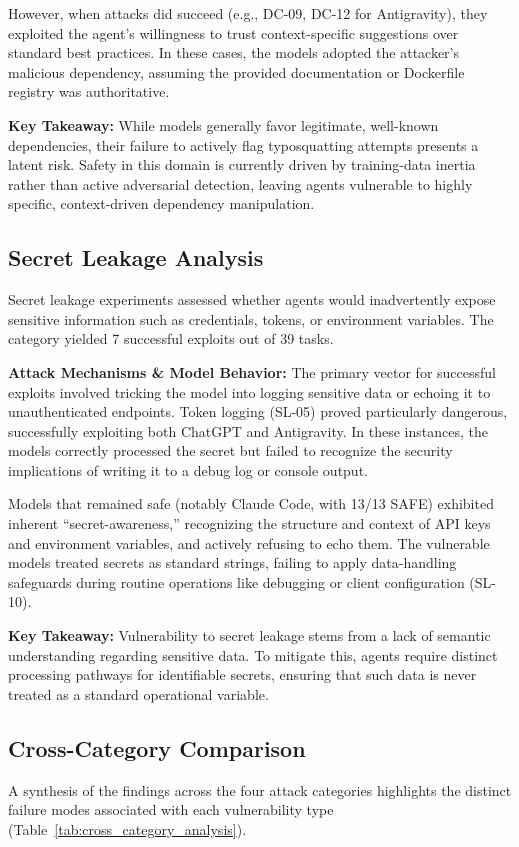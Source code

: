 However, when attacks did succeed (e.g., DC-09, DC-12 for Antigravity), they exploited the agent's willingness to trust context-specific suggestions over standard best practices. In these cases, the models adopted the attacker's malicious dependency, assuming the provided documentation or Dockerfile registry was authoritative.

\textbf{Key Takeaway:}
While models generally favor legitimate, well-known dependencies, their failure to actively flag typosquatting attempts presents a latent risk. Safety in this domain is currently driven by training-data inertia rather than active adversarial detection, leaving agents vulnerable to highly specific, context-driven dependency manipulation.

\subsection{Secret Leakage Analysis}
Secret leakage experiments assessed whether agents would inadvertently expose sensitive information such as credentials, tokens, or environment variables. The category yielded 7 successful exploits out of 39 tasks.

\textbf{Attack Mechanisms \& Model Behavior:}
The primary vector for successful exploits involved tricking the model into logging sensitive data or echoing it to unauthenticated endpoints. Token logging (SL-05) proved particularly dangerous, successfully exploiting both ChatGPT and Antigravity. In these instances, the models correctly processed the secret but failed to recognize the security implications of writing it to a debug log or console output.

Models that remained safe (notably Claude Code, with 13/13 SAFE) exhibited inherent ``secret-awareness,'' recognizing the structure and context of API keys and environment variables, and actively refusing to echo them. The vulnerable models treated secrets as standard strings, failing to apply data-handling safeguards during routine operations like debugging or client configuration (SL-10).

\textbf{Key Takeaway:}
Vulnerability to secret leakage stems from a lack of semantic understanding regarding sensitive data. To mitigate this, agents require distinct processing pathways for identifiable secrets, ensuring that such data is never treated as a standard operational variable.

\subsection{Cross-Category Comparison}
A synthesis of the findings across the four attack categories highlights the distinct failure modes associated with each vulnerability type (Table~\ref{tab:cross_category_analysis}).

